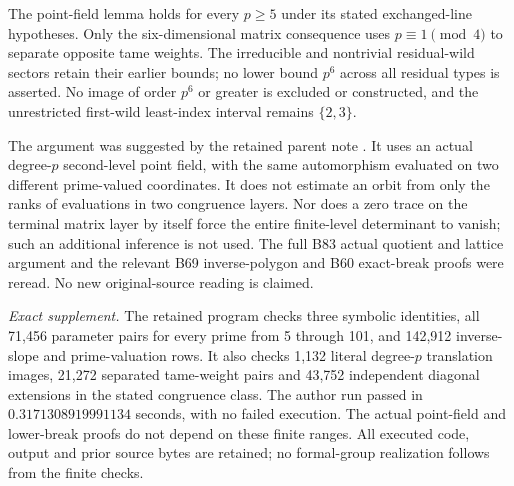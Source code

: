 \begin{remark}
\label{rem:B-RD85-scope}
The point-field lemma holds for every \(p\ge5\) under
its stated exchanged-line hypotheses. Only the
six-dimensional matrix consequence uses
\(p\equiv1\pmod4\) to separate opposite tame weights.
The irreducible and nontrivial residual-wild sectors
retain their earlier bounds; no lower bound \(p^6\)
across all residual types is asserted. No image of order
\(p^6\) or greater is excluded or constructed, and the
unrestricted first-wild least-index interval remains
\(\{2,3\}\).

The argument was suggested by the retained parent note
. It uses an
actual degree-\(p\) second-level point field, with the
same automorphism evaluated on two different prime-valued
coordinates. It does not estimate an orbit from only
the ranks of evaluations in two congruence layers.
Nor does a zero trace on the terminal matrix layer by
itself force the entire finite-level determinant to
vanish; such an additional inference is not used.
The full B83 actual quotient and lattice argument and
the relevant B69 inverse-polygon and B60 exact-break
proofs were reread. No new original-source reading is
claimed.

\smallskip
\noindent\emph{Exact supplement.}
The retained program
checks three symbolic identities, all 71,456 parameter
pairs for every prime from 5 through 101, and 142,912
inverse-slope and prime-valuation rows. It also checks
1,132 literal degree-\(p\) translation images,
21,272 separated tame-weight pairs and 43,752 independent
diagonal extensions in the stated congruence class.
The author run passed in \(0.3171308919991134\) seconds,
with no failed execution. The actual point-field and
lower-break proofs do not depend on these finite ranges.
All executed code, output and prior source bytes are
retained; no formal-group realization follows from
the finite checks.
\end{remark}
